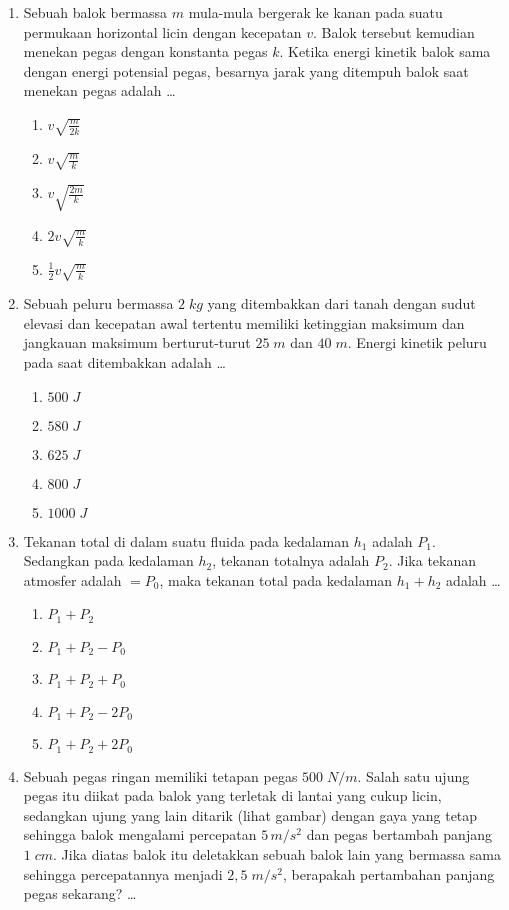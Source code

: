 \documentclass[A4,12PT, english, twocolumn]{journal}
\begin{document}
\begin{enumerate}
\newpage
\item Sebuah balok bermassa $m$ mula-mula bergerak ke kanan pada suatu permukaan horizontal licin dengan kecepatan $v$. Balok tersebut kemudian menekan pegas dengan konstanta pegas $k$. Ketika energi kinetik balok sama dengan energi potensial pegas, besarnya jarak yang ditempuh balok saat menekan pegas adalah \dots
    \begin{enumerate}
        \item $v \sqrt{\frac{m}{2k}}$
        \item $v \sqrt{\frac{m}{k}}$
        \item $v \sqrt{\frac{2m}{k}}$
        \item $2v \sqrt{\frac{m}{k}}$
        \item $\frac{1}{2} v \sqrt{\frac{m}{k}}$
    \end{enumerate}
  
\item Sebuah peluru bermassa $2 \; kg$ yang ditembakkan dari tanah dengan sudut elevasi dan kecepatan awal tertentu memiliki ketinggian maksimum dan jangkauan maksimum berturut-turut $25 \; m$ dan $40 \; m$. Energi kinetik peluru pada saat ditembakkan adalah \dots
    \begin{enumerate}
        \item $500 \; J$
        \item $580 \; J$
        \item $625 \; J$
        \item $800 \; J$
        \item $1000 \; J$
    \end{enumerate}
     
\item Tekanan total di dalam suatu fluida pada kedalaman $h_1$ adalah $P_1$. Sedangkan pada kedalaman $h_2$, tekanan totalnya adalah $P_2$. Jika tekanan atmosfer adalah $=P_0$, maka tekanan total pada kedalaman $h_1+h_2$ adalah \dots
    \begin{enumerate}
        \item $P_1+P_2$
        \item $P_1+P_2-P_0$
        \item $P_1+P_2+P_0$
        \item $P_1+P_2-2P_0$
        \item $P_1+P_2+2P_0$
    \end{enumerate}
   
\item Sebuah pegas ringan memiliki tetapan pegas $500 \; N/m$. Salah satu ujung pegas itu diikat pada balok yang terletak di lantai yang cukup licin, sedangkan ujung yang lain ditarik (lihat gambar) dengan gaya yang tetap sehingga balok mengalami percepatan $5 \, m/s^2$ dan pegas bertambah panjang $1 \; cm$. Jika diatas balok itu deletakkan sebuah balok lain yang bermassa sama sehingga percepatannya menjadi $2,5 \; m/s^2$, berapakah pertambahan panjang pegas sekarang? \dots
\begin{center}
    \begin{tikzpicture}


\end{tikzpicture}
\end{center}
\end{enumerate}
\end{document}
